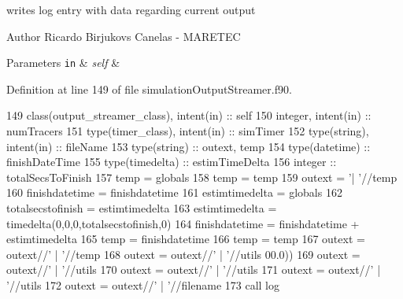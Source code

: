 writes log entry with data regarding current output 

\begin{DoxyAuthor}{Author}
Ricardo Birjukovs Canelas -\/ M\+A\+R\+E\+T\+EC 
\end{DoxyAuthor}

\begin{DoxyParams}[1]{Parameters}
\mbox{\tt in}  & {\em self} & \\
\hline
\end{DoxyParams}


Definition at line 149 of file simulation\+Output\+Streamer.\+f90.


\begin{DoxyCode}
149     \textcolor{keywordtype}{class}(output\_streamer\_class), \textcolor{keywordtype}{intent(in)} :: self
150     \textcolor{keywordtype}{integer}, \textcolor{keywordtype}{intent(in)} :: numTracers
151     \textcolor{keywordtype}{type}(timer\_class), \textcolor{keywordtype}{intent(in)} :: simTimer
152     \textcolor{keywordtype}{type}(string), \textcolor{keywordtype}{intent(in)} :: fileName
153     \textcolor{keywordtype}{type}(string) :: outext, temp
154     \textcolor{keywordtype}{type}(datetime) :: finishDateTime
155     \textcolor{keywordtype}{type}(timedelta) :: estimTimeDelta
156     \textcolor{keywordtype}{integer} :: totalSecsToFinish
157     temp = globals%
158     temp = temp%
159     outext = \textcolor{stringliteral}{'| '}//temp
160     finishdatetime = finishdatetime%
161     estimtimedelta = globals%
162     totalsecstofinish = estimtimedelta%
163     estimtimedelta = timedelta(0,0,0,totalsecstofinish,0)
164     finishdatetime = finishdatetime + estimtimedelta
165     temp = finishdatetime%
166     temp = temp%
167     outext = outext//\textcolor{stringliteral}{' | '}//temp
168     outext = outext//\textcolor{stringliteral}{' | '}//utils%
      00.0))
169     outext = outext//\textcolor{stringliteral}{' | '}//utils%
170     outext = outext//\textcolor{stringliteral}{' | '}//utils%
171     outext = outext//\textcolor{stringliteral}{' | '}//utils%
172     outext = outext//\textcolor{stringliteral}{' | '}//filename
173     \textcolor{keyword}{call }log%
\end{DoxyCode}
\mbox{\label{namespacesimulationoutputstreamer__mod_a689f65c821b78d46b142653214338b85}} 
